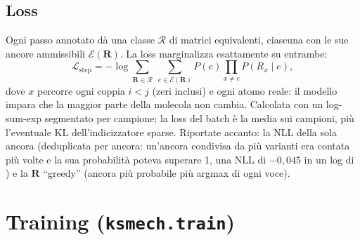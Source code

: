 \documentclass[11pt,a4paper]{report}
\newcommand{\code}[1]{\texttt{\detokenize{#1}}}
\newcommand{\vb}[1]{\bm{#1}}
\begin{document}
\section{Loss}
Ogni passo annotato dà una classe $\mathcal{R}$ di matrici equivalenti, ciascuna con le sue ancore
ammissibili $\mathcal{E}(\vb{R})$. La loss marginalizza esattamente su entrambe:
\[
\mathcal{L}_{\mathrm{step}}=-\log\sum_{\vb{R}\in\mathcal{R}}\ \sum_{e\in\mathcal{E}(\vb{R})}
P(e)\prod_{x\ne e}P(R_x\mid e),
\]
dove $x$ percorre ogni coppia $i<j$ (zeri inclusi) e ogni atomo reale: il modello impara che la maggior
parte della molecola non cambia. Calcolata con un log-sum-exp segmentato per campione; la loss del batch
è la media sui campioni, più l'eventuale KL dell'indicizzatore sparse. Riportate accanto: la NLL della
sola ancora (deduplicata per ancora: un'ancora condivisa da più varianti era contata più volte e la sua
probabilità poteva superare 1, una NLL di $-0{,}045$ in un log di \code{flex_first}) e la $\vb{R}$
\enquote{greedy} (ancora più probabile più argmax di ogni voce).
\chapter{Training (\texttt{ksmech.train})}
\label{ch:training}
\end{document}
